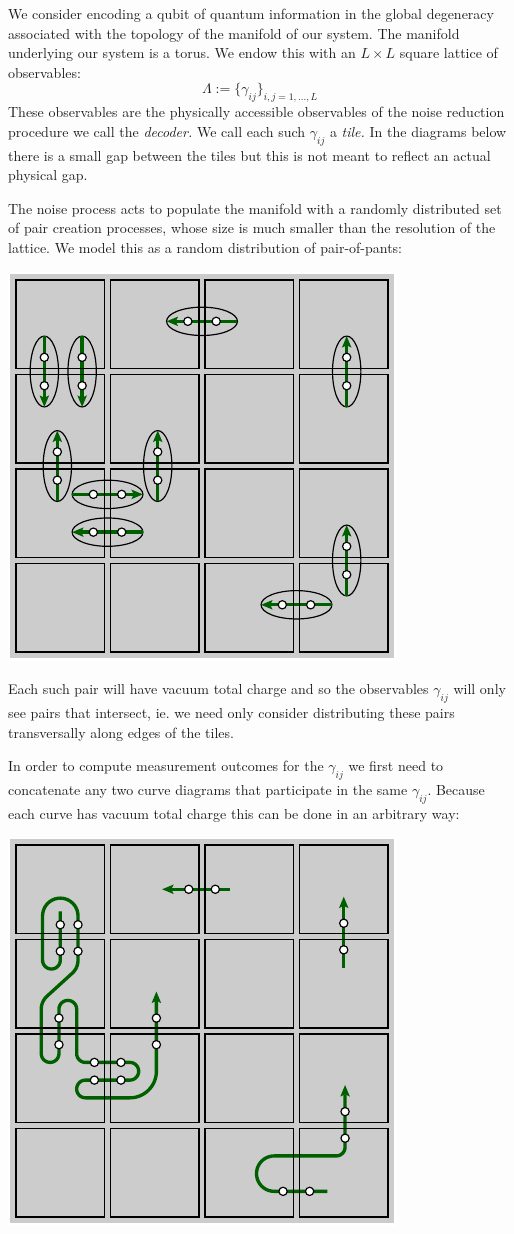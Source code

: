 We consider encoding a qubit of quantum information in the global degeneracy associated
with the topology of the manifold of our system.
The manifold underlying our system is a torus.
We endow this with an $L\times L$ square lattice of observables:
$$
    \Lambda := \bigl\{ \gamma_{ij} \bigr\}_{i,j=1,...,L}
$$
These observables are the physically accessible observables of
the noise reduction procedure we call the \emph{decoder.}
We call each such $\gamma_{ij}$ a \emph{tile.}
In the diagrams below 
there is a small gap between the tiles but this is not meant
to reflect an actual physical gap.

The noise process acts to populate the manifold with
a randomly distributed set of pair creation processes,
whose size is much smaller than the resolution of the lattice.
We model this as a random distribution of pair-of-pants:
\begin{center}
\includegraphics[width=0.3\columnwidth ]{pic-pair-create.pdf}
\end{center}

Each such pair will have vacuum total charge and so the observables
$\gamma_{ij}$ will only see pairs that intersect, ie. we
need only consider distributing these pairs
transversally along edges of the tiles.

In order to compute measurement outcomes for the $\gamma_{ij}$
we first need to concatenate any two curve diagrams that 
participate in the same $\gamma_{ij}.$
Because each curve has vacuum total charge this can be
done in an arbitrary way:
\begin{center}
\includegraphics[width=0.3\columnwidth ]{pic-join-pairs.pdf}
\end{center}

